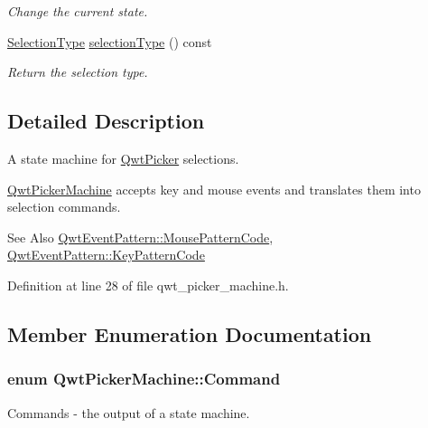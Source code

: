 \begin{DoxyCompactItemize}
\begin{DoxyCompactList}\small\item\em Change the current state. \end{DoxyCompactList}\item 
\hyperlink{class_qwt_picker_machine_a24a9faf12cfa5746eee839a2c0bb937d}{Selection\-Type} \hyperlink{class_qwt_picker_machine_a9ccd6ccb3fa0e2a73730e69a8658c316}{selection\-Type} () const 
\begin{DoxyCompactList}\small\item\em Return the selection type. \end{DoxyCompactList}\end{DoxyCompactItemize}


\subsection{Detailed Description}
A state machine for \hyperlink{class_qwt_picker}{Qwt\-Picker} selections. 

\hyperlink{class_qwt_picker_machine}{Qwt\-Picker\-Machine} accepts key and mouse events and translates them into selection commands.

\begin{DoxySeeAlso}{See Also}
\hyperlink{class_qwt_event_pattern_af48dc808ac5e125eeed41a4c0285d1ea}{Qwt\-Event\-Pattern\-::\-Mouse\-Pattern\-Code}, \hyperlink{class_qwt_event_pattern_a8fb57ceb9982d5583a1bf568e37d3007}{Qwt\-Event\-Pattern\-::\-Key\-Pattern\-Code} 
\end{DoxySeeAlso}


Definition at line 28 of file qwt\-\_\-picker\-\_\-machine.\-h.



\subsection{Member Enumeration Documentation}
\hypertarget{class_qwt_picker_machine_a3a8d3d4c107ce5f8351e4cbdd38c43f7}{
\subsubsection[{Command}]{\setlength{\rightskip}{0pt plus 5cm}enum {\bf Qwt\-Picker\-Machine\-::\-Command}}}\label{class_qwt_picker_machine_a3a8d3d4c107ce5f8351e4cbdd38c43f7}


Commands -\/ the output of a state machine. 

